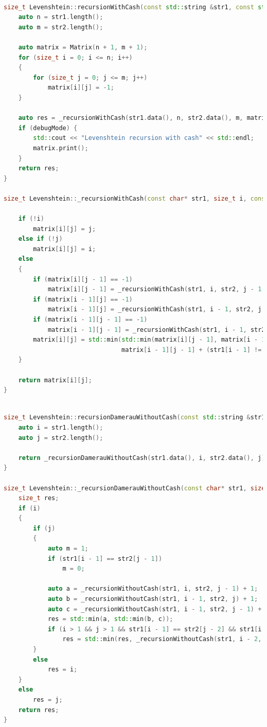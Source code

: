         \begin{lstlisting}[language=C++, label=lst:rec-matr:Levenstein, caption=Функция рекурсивного поиска с заполнением матрицы]

size_t Levenshtein::recursionWithCash(const std::string &str1, const std::string &str2, bool debugMode) {
    auto n = str1.length();
    auto m = str2.length();

    auto matrix = Matrix(n + 1, m + 1);
    for (size_t i = 0; i <= n; i++)
    {
        for (size_t j = 0; j <= m; j++)
            matrix[i][j] = -1;
    }

    auto res = _recursionWithCash(str1.data(), n, str2.data(), m, matrix);
    if (debugMode) {
        std::cout << "Levenshtein recursion with cash" << std::endl;
        matrix.print();
    }
    return res;
}

size_t Levenshtein::_recursionWithCash(const char* str1, size_t i, const char* str2, size_t j, Matrix& matrix) {

    if (!i)
        matrix[i][j] = j;
    else if (!j)
        matrix[i][j] = i;
    else
    {
        if (matrix[i][j - 1] == -1)
            matrix[i][j - 1] = _recursionWithCash(str1, i, str2, j - 1, matrix);
        if (matrix[i - 1][j] == -1)
            matrix[i - 1][j] = _recursionWithCash(str1, i - 1, str2, j, matrix);
        if (matrix[i - 1][j - 1] == -1)
            matrix[i - 1][j - 1] = _recursionWithCash(str1, i - 1, str2, j - 1, matrix);
        matrix[i][j] = std::min(std::min(matrix[i][j - 1], matrix[i - 1][j]) + 1,
                                matrix[i - 1][j - 1] + (str1[i - 1] != str2[j - 1]));
    }

    return matrix[i][j];
}
        \end{lstlisting}

        \begin{lstlisting}[language=C++, label=lst:matr:Dameray-Levenstein, caption=Функция поиска растояния Дамерау-Левенштейна]

size_t Levenshtein::recursionDamerauWithoutCash(const std::string &str1, const std::string &str2) {
    auto i = str1.length();
    auto j = str2.length();

    return _recursionDamerauWithoutCash(str1.data(), i, str2.data(), j);
}

size_t Levenshtein::_recursionDamerauWithoutCash(const char* str1, size_t i, const char* str2, size_t j) {
    size_t res;
    if (i)
    {
        if (j)
        {
            auto m = 1;
            if (str1[i - 1] == str2[j - 1])
                m = 0;

            auto a = _recursionWithoutCash(str1, i, str2, j - 1) + 1;
            auto b = _recursionWithoutCash(str1, i - 1, str2, j) + 1;
            auto c = _recursionWithoutCash(str1, i - 1, str2, j - 1) + m;
            res = std::min(a, std::min(b, c));
            if (i > 1 && j > 1 && str1[i - 1] == str2[j - 2] && str1[i - 2] == str2[j - 1])
                res = std::min(res, _recursionWithoutCash(str1, i - 2, str2, j - 2) + 1);
        }
        else
            res = i;
    }
    else
        res = j;
    return res;
}
        \end{lstlisting}
    
